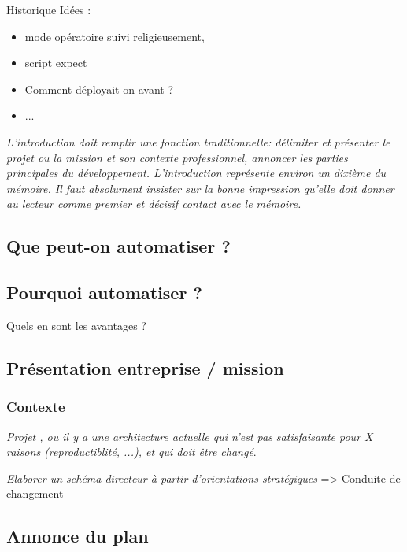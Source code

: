 Historique Idées : 
	
\begin{itemize}
	\item mode opératoire suivi religieusement, 
	\item script expect
	\item Comment déployait-on avant ?
	\item ...
\end{itemize}

\textit{L’introduction doit remplir une fonction traditionnelle: délimiter et présenter le projet ou la mission et son contexte professionnel, annoncer les parties principales du développement. L’introduction représente environ un dixième du mémoire. Il faut absolument insister sur la bonne impression qu’elle doit donner au lecteur comme premier et décisif contact avec le mémoire.}

\subsection{Que peut-on automatiser ?}

\subsection{Pourquoi automatiser ?}

Quels en sont les avantages ?

\subsection{Présentation entreprise / mission}

\subsubsection{Contexte}

\textit{Projet \bv{}, ou il y a une architecture actuelle qui n'est pas satisfaisante pour X raisons (reproductiblité, ...), et qui doit être changé}.

\textit{Elaborer un schéma directeur à partir d’orientations stratégiques} => Conduite de changement


\subsection{Annonce du plan}